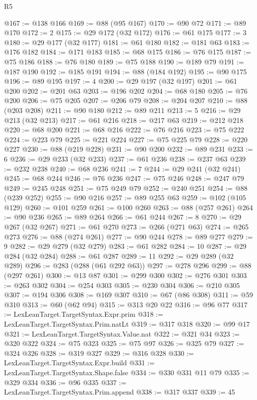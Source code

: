 \begin{lexlean}{R5}
\begin{coremodule}
@167 := @138 @166
@169 := @88 (@95 @167)
@170 := @90 @72
@171 := @89 @170
@172 := 2
@175 := @29 @172 (@32 @172)
@176 := @61 @175
@177 := 3
@180 := @29 @177 (@32 @177)
@181 := @61 @180
@182 := @181 @63
@183 := @176 @182
@184 := @171 @183
@185 := @68 @175
@186 := @76 @175
@187 := @75 @186
@188 := @76 @180
@189 := @75 @188
@190 := @189 @79
@191 := @187 @190
@192 := @185 @191
@194 := @88 (@184 @192)
@195 := @90 @175
@196 := @89 @195
@197 := 4
@200 := @29 @197 (@32 @197)
@201 := @61 @200
@202 := @201 @63
@203 := @196 @202
@204 := @68 @180
@205 := @76 @200
@206 := @75 @205
@207 := @206 @79
@208 := @204 @207
@210 := @88 (@203 @208)
@211 := @90 @180
@212 := @89 @211
@213 := 5
@216 := @29 @213 (@32 @213)
@217 := @61 @216
@218 := @217 @63
@219 := @212 @218
@220 := @68 @200
@221 := @68 @216
@222 := @76 @216
@223 := @75 @222
@224 := @223 @79
@225 := @221 @224
@227 := @75 @225 @79
@228 := @220 @227
@230 := @88 (@219 @228)
@231 := @90 @200
@232 := @89 @231
@233 := 6
@236 := @29 @233 (@32 @233)
@237 := @61 @236
@238 := @237 @63
@239 := @232 @238
@240 := @68 @236
@241 := 7
@244 := @29 @241 (@32 @241)
@245 := @68 @244
@246 := @76 @236
@247 := @75 @246
@248 := @247 @79
@249 := @245 @248
@251 := @75 @249 @79
@252 := @240 @251
@254 := @88 (@239 @252)
@255 := @90 @216
@257 := @89 @255 @63
@259 := @102 (@105 @129)
@260 := @101 @259
@261 := @100 @260
@263 := @88 (@257 @261)
@264 := @90 @236
@265 := @89 @264
@266 := @61 @244
@267 := 8
@270 := @29 @267 (@32 @267)
@271 := @61 @270
@273 := @266 (@271 @63)
@274 := @265 @273
@276 := @88 (@274 @261)
@277 := @90 @244
@278 := @89 @277
@279 := 9
@282 := @29 @279 (@32 @279)
@283 := @61 @282
@284 := 10
@287 := @29 @284 (@32 @284)
@288 := @61 @287
@289 := 11
@292 := @29 @289 (@32 @289)
@296 := @283 (@288 (@61 @292 @63))
@297 := @278 @296
@299 := @88 (@297 @261)
@300 := @13 @87
@301 := @299 @300
@302 := @276 @301
@303 := @263 @302
@304 := @254 @303
@305 := @230 @304
@306 := @210 @305
@307 := @194 @306
@308 := @169 @307
@310 := @67 (@86 @308)
@311 := @59 @310
@313 := @60 (@62 @94)
@315 := @313 @20 @22
@316 := @96 @77
@317 := LexLeanTarget.TargetSyntax.Expr.prim
@318 := LexLeanTarget.TargetSyntax.Prim.natLt
@319 := @317 @318
@320 := @99 @17
@321 := LexLeanTarget.TargetSyntax.Value.nat
@322 := @321 @34
@323 := @320 @322
@324 := @75 @323
@325 := @75 @97
@326 := @325 @79
@327 := @324 @326
@328 := @319 @327
@329 := @316 @328
@330 := LexLeanTarget.TargetSyntax.Expr.build
@331 := LexLeanTarget.TargetSyntax.Shape.false
@334 := @330 @331 @11 @79
@335 := @329 @334
@336 := @96 @335
@337 := LexLeanTarget.TargetSyntax.Prim.append
@338 := @317 @337
@339 := 45

\end{coremodule}
\end{lexlean}
